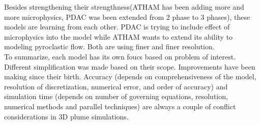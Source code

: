 \documentclass[10pt,a4paper]{article}
\begin{document}
Besides strengthening their strengthness(ATHAM has been adding more and more microphysics, PDAC was been extended from 2 phase to 3 phases), these models are learning from each other. PDAC is trying to include effect of microphysics into the model while ATHAM wants to extend its ability to modeling pyroclastic flow. Both are using finer and finer resolution.\\
To summarize, each model has its own foucs based on problem of interest. Different simplification was made based on their scope. Improvements have been making since their birth. Accuracy (depends on comprehensiveness of the model, resolution of discretization, numerical error, and order of accuracy) and simulation time (depends on number of governing equations, resolution, numerical methods and parallel techniques) are always a couple of conflict considerations in 3D plume simulations.\\
\end{document}
